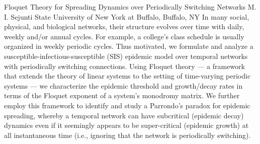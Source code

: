 
    \begin{abstract_online}{Floquet Theory for Spreading Dynamics over Periodically Switching Networks}{%
        M. I. Sejunti}{%
        }{%
        State University of New York at Buffalo, Buffalo, NY}
    In many social, physical, and biological networks, their structure evolves over time with daily, weekly and/or annual cycles. For example, a college's class schedule is usually organized in weekly periodic cycles.  Thus motivated, we formulate and analyze a susceptible-infectious-susceptible (SIS) epidemic model over temporal networks with  periodically switching connections.  Using Floquet theory --- a framework that extends the theory of linear systems to the setting of time-varying periodic systems --- we characterize the epidemic threshold and growth/decay rates in terms of the Floquet exponent of a system's monodromy matrix. We further employ this framework to identify and study a Parrondo's paradox for  epidemic spreading, whereby a temporal network can have subcritical (epidemic decay) dynamics even if it seemingly appears to be super-critical (epidemic growth) at all instantaneous time (i.e., ignoring that the network is periodically switching). 
    
    \end{abstract_online}
    